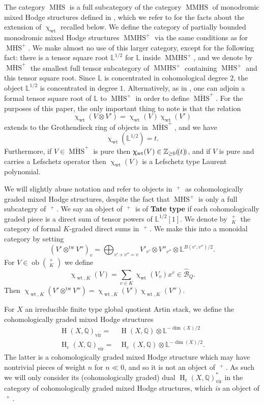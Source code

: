 \documentclass{amsart}
\DeclareMathOperator{\tw}{tw}
\newcommand{\LL}{\mathbb{L}}
\DeclareMathOperator{\MHS}{MHS}
\DeclareMathOperator{\MMHS}{MMHS}
\DeclareMathOperator{\Wt}{wt}
\DeclareMathOperator{\HO}{H}
\DeclareMathOperator{\mMHS}{\overline{MHS}}
\DeclareMathOperator{\vir}{vir}
\newcommand{\lcbs}{(\!(}
\newcommand{\rcbs}{)\!)}
\DeclareMathOperator{\ob}{ob}
\def\!{\mskip-\thinmuskip}
\renewcommand{\chi}{\upchi}
\theoremstyle{plain}%
\theoremstyle{definition}
\theoremstyle{remark}
\begin{document}
The category $\MHS$ is a full subcategory of the category $\MMHS$ of monodromic mixed Hodge structures defined in \cite[Sec.7]{CoHA}, which we refer to for the facts about the extension of $\chi_{\Wt}$ recalled below.  We define the category of partially bounded monodromic mixed Hodge structures $\MMHS^+$ via the same conditions as for $\MHS^+$.  We make almost no use of this larger category, except for the following fact: there is a tensor square root $\mathbb{L}^{1/2}$ for $\mathbb{L}$ inside $\MMHS^+$, and we denote by $\overline{\MHS}^+$ the smallest full tensor subcategory of $\MMHS^+$ containing $\MHS^+$ and this tensor square root.  Since $\LL$ is concentrated in cohomological degree $2$, the object $\LL^{1/2}$ is concentrated in degree $1$.  Alternatively, as in \cite[Sec 3.4]{CoHA}, one can adjoin a formal tensor square root of $\mathbb{L}$ to $\MHS^+$ in order to define $\overline{\MHS}^+$.  For the purposes of this paper, the only important thing to note is that the relation
\[
\chi_{\Wt}(V\otimes V')=\chi_{\Wt}(V)\chi_{\Wt}(V')
\]
extends to the Grothendieck ring of objects in $\overline{\MHS}^+$, and we have
\[
\chi_{\Wt}(\mathbb{L}^{1/2})=t.
\]
Furthermore, if $V\in \overline{\MHS}^+$ is pure then $\chi_{\Wt}(V)\in\mathbb{Z}_{\geq 0}\lcbs t\rcbs$, and if $V$ is pure and carries a Lefschetz operator then $\chi_{\Wt}(V)$ is a Lefschetz type Laurent polynomial.


  We will slightly abuse notation and refer to objects in $\mMHS^+$ as cohomologically graded mixed Hodge structures, despite the fact that $\MHS^+$ is only a full subcategry of $\mMHS^+$.  We say an object of $\mMHS^+$ is of \textbf{Tate type} if each cohomologically graded piece is a direct sum of tensor powers of $\LL^{1/2}[1]$.  We denote by $\mMHS_{ K}^+$ the category of formal $K$-graded direct sums in $\mMHS^+$.  We make this into a monoidal category by setting
\[
(V'\otimes^{\tw}V'')_{v}=\bigoplus_{v'+v''=v}V'_{v'}\otimes V''_{v''}\otimes\LL^{B(v',v'')/2}.
\]
For $V\in \ob(\mMHS_{K}^+)$ we define
\[
\chi_{\Wt,K}(V)=\sum_{v\in K}\chi_{\Wt}(V_v)x^v\in \hat{\mathscr{B}}_Q.
\]
Then $\chi_{\Wt,K}(V'\otimes^{\tw}V'')=\chi_{\Wt,K}(V')\chi_{\Wt,K}(V'')$.


For $X$ an irreducible finite type global quotient Artin stack, we define the cohomologically graded mixed Hodge structures
\begin{align*}
\HO(X,\mathbb{Q})_{\vir}=&\HO(X,\mathbb{Q})\otimes \LL^{-\dim(X)/2}\\
\HO_c(X,\mathbb{Q})_{\vir}=&\HO_c(X,\mathbb{Q})\otimes \LL^{-\dim(X)/2}.
\end{align*}
The latter is a cohomologically graded mixed Hodge structure which may have nontrivial pieces of weight $n$ for $n\ll 0$, and so it is not an object of $\mMHS^+$.  As such we will only consider its (cohomologically graded) dual $\HO_c(X,\mathbb{Q})_{\vir}^*$ in the category of cohomologically graded mixed Hodge structures, which \textit{is} an object of $\mMHS^+$.
\end{document}
